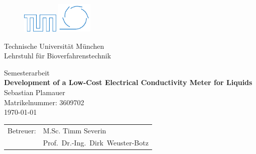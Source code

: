 \begin{figure}[H]
	\begin{center}
		\includegraphics[width=0.15\textwidth]{images/title/logo-TUM-empty}
    \hspace{.65\textwidth}
    \includegraphics[width=0.15\textwidth]{images/title/logo-MW}
	\end{center}
\end{figure}

\begin{center}
	{\Huge Technische Universit\"at M\"unchen}
	\\[5mm]
	{\Large Lehrstuhl f\"ur Bioverfahrenstechnik}
\end{center}

\vspace{15mm}

\begin{center}
    \begin{minipage}{.7\textwidth}
        \begin{center}
            \doublespacing
            {
                {
                    \Large Semesterarbeit
                }
                \\[1cm]
                \textbf{\LARGE Development of a Low-Cost Electrical Conductivity Meter for Liquids}
            }
            \\[3.5cm]
            {\Large Sebastian Plamauer}
            \\
            {\normalsize Matrikelnummer: 3609702}
            \\[0.5cm]
            \today
        \end{center}
    \end{minipage}
\end{center}

\vspace{\fill}
  
\begin{center}
    \begin{tabular}{p{3cm}l}
        Betreuer: & M.Sc. Timm Severin \\
        & Prof.~Dr.-Ing.~Dirk~Weuster-Botz
    \end{tabular}	 
\end{center}

\clearpage\mbox{}\clearpage

%
